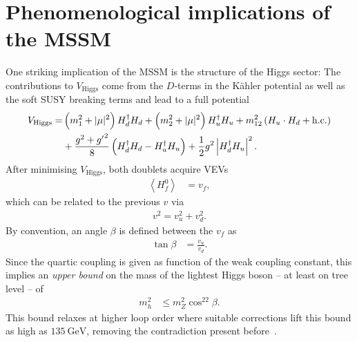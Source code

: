 \section{Phenomenological implications of the MSSM}\label{mssm-details}
One striking implication of the MSSM is the structure of the Higgs sector:
The contributions to $V_\mathrm{Higgs}$ come from the $D$-terms in the Kähler potential as well as the soft SUSY breaking terms and lead to a full potential
\begin{align}\nonumber
  V_\mathrm{Higgs}=&\left(m_1^2+|\mu|^2\right)H_d^\dagger H_d+\left(m_2^2+|\mu|^2\right)H_u^\dagger H_u+m_{12}^2\left(H_u\cdot H_d+\mathrm{h. c.}\right)\\
  &+\frac{g^2+{g'}^2}8\left(H_d^\dagger H_d-H_u^\dagger H_u\right)+\frac12g^2\left|H_d^\dagger H_u\right|^2.
\end{align}
After minimising $V_\mathrm{Higgs}$, both doublets acquire VEVs
\begin{align}
\left\langle H_f^0\right\rangle&=v_f,
\end{align}
which can be related to the previous $v$ via
\begin{align}
v^2=v_u^2+v_d^2.
\end{align}
By convention, an angle $\beta$ is defined between the $v_f$ as
\begin{align}
  \tan\beta&=\frac{v_u}{v_d}.
\end{align}
Since the quartic coupling is given as function of the weak coupling constant, this implies an \textit{upper bound} on the mass of the lightest Higgs boson – at least on tree level – of
\begin{align}
  m^2_h&\le m^2_Z\cos^22\beta.
\end{align}
This bound relaxes at higher loop order where suitable corrections lift this bound as high as $\SI{135}{\GeV}$, removing the contradiction present before~\cite{pdg, higgs, peskin, primer, haber}.

